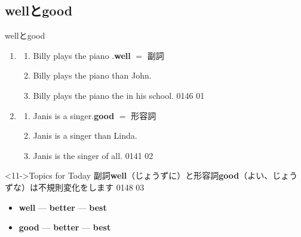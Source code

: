 \documentclass[aspectratio=169,xcolor={dvipsnames,table}]{beamer}
\begin{document}
\subsection{wellとgood}
\begin{frame}[plain]{wellとgood}
 \begin{enumerate}
  \item \begin{enumerate}
	 \item<1-> Billy plays the piano .\hfill{\textbf{well} $=$ 副詞}
	 \item<2-> Billy plays the piano   than John.
	 \item<4-> Billy plays the piano the  in his school.%
\hfill{\tiny 0146}\,{\scriptsize {}\,01}
	\end{enumerate}
  \item \begin{enumerate}
	 \item<6-> Janis is a  singer.\hfill{}\textbf{good} $=$ 形容詞
	 \item<7-> Janis is a  singer than Linda.
	 \item<9-> Janis is the  singer of all.
\hfill{\tiny 0141}\,{\scriptsize {}\,02}
	\end{enumerate}
 \end{enumerate}

\begin{block}<11->{Topics for Today}\small
副詞{\bfseries well}（じょうずに）と形容詞{\bfseries good}（よい、じょうずな）は不規則変化をします%
\hfill{\tiny 0148}\,{\scriptsize {}\,\tiny{03}}

\begin{itemize}[square]\small
 \item {\bfseries well}  --- {\bfseries better}  --- {\bfseries best} 
 \item {\bfseries good}  --- {\bfseries better} --- {\bfseries best} 
 \end{itemize}
     \end{block}
\end{frame}
\end{document}
